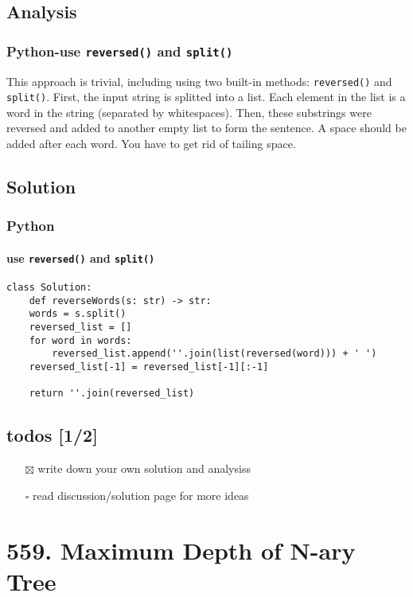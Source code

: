 \documentclass[12pt]{article}
\begin{document}
\subsection{Analysis}
\label{sec:org74800d6}
\subsubsection{Python-use \texttt{reversed()} and \texttt{split()}}
\label{sec:orga4008ce}
This approach is trivial, including using two built-in methods: \texttt{reversed()} and \texttt{split()}. First, the input string is splitted into a list. Each element in the list is a word in the string (separated by whitespaces). Then, these substrings were reversed and added to another empty list to form the sentence. A space should be added after each word. You have to get rid of tailing space.
\subsection{Solution}
\label{sec:orge8819c5}
\subsubsection{Python}
\label{sec:org8e1431b}
\paragraph{use \texttt{reversed()} and \texttt{split()}}
\label{sec:orgbcb208c}
\begin{verbatim}
class Solution:
    def reverseWords(s: str) -> str:
	words = s.split()
	reversed_list = []
	for word in words:
	    reversed_list.append(''.join(list(reversed(word))) + ' ')
	reversed_list[-1] = reversed_list[-1][:-1]

	return ''.join(reversed_list)
\end{verbatim}
\subsection{todos [1/2]}
\label{sec:orgbc917dc}
\begin{itemize}
\item[{$\boxtimes$}] write down your own solution and analysiss
\item[{$\square$}] read discussion/solution page for more ideas
\end{itemize}
\section{559. Maximum Depth of N-ary Tree \label{org4a92210}}
\label{sec:org36f1412}
\end{document}
